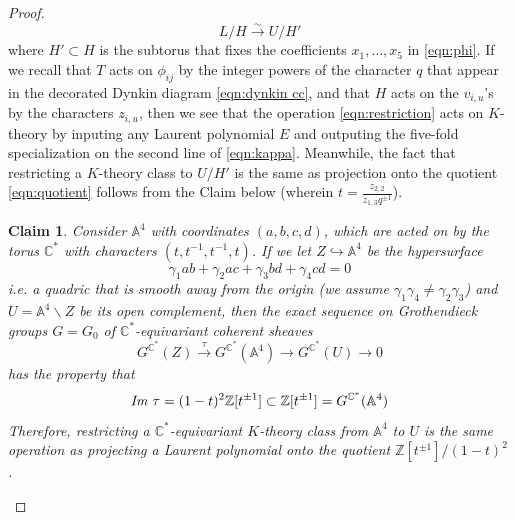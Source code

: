 \documentclass{amsart}
\newtheorem{claim}[subsection]{Claim}
\def\BA{{\mathbb{A}}}
\def\BC{{\mathbb{C}}}
\def\BZ{{\mathbb{Z}}}
\begin{document}
\begin{proof}
\begin{equation}
\label{eqn:restriction}
L/H \xrightarrow{\sim} U/H'
\end{equation}
where $H' \subset H$ is the subtorus that fixes the coefficients $x_1,\dots,x_5$ in \eqref{eqn:phi}. If we recall that $T$ acts on $\phi_{ij}$ by the integer powers of the character $q$ that appear in the decorated Dynkin diagram \eqref{eqn:dynkin cc}, and that $H$ acts on the $v_{i,u}$'s by the characters $z_{i,u}$, then we see that the operation \eqref{eqn:restriction} acts on $K$-theory by inputing any Laurent polynomial $E$ and outputing the five-fold specialization on the second line of \eqref{eqn:kappa}. Meanwhile, the fact that restricting a $K$-theory class to $U/H'$ is the same as projection onto the quotient \eqref{eqn:quotient} follows from the Claim below (wherein $t = \frac {z_{2,2}}{z_{1,3}q^{\pm 1}}$).

\medskip 

\begin{claim}

Consider $\BA^4$ with coordinates $(a,b,c,d)$, which are acted on by the torus $\BC^*$ with characters $(t,t^{-1},t^{-1},t)$. If we let $Z \hookrightarrow \BA^4$ be the hypersurface
\begin{equation}
\label{eqn:eqn}
\gamma_1 ab + \gamma_2 ac + \gamma_3 bd + \gamma_4 cd = 0
\end{equation}
i.e. a quadric that is smooth away from the origin (we assume $\gamma_1\gamma_4 \neq \gamma_2\gamma_3$) and $U = \BA^4 \backslash Z$ be its open complement, then the exact sequence on Grothendieck groups $G = G_0$ of $\BC^*$-equivariant coherent sheaves
\[
G^{\BC^*}(Z) \xrightarrow{\tau} G^{\BC^*}(\BA^4) \rightarrow G^{\BC^*}(U) \rightarrow 0
\]
has the property that 
\[
\emph{Im }\tau = (1-t)^2 \BZ[t^{\pm 1}] \subset \BZ[t^{\pm 1}] = G^{\BC^*}(\BA^4)
\]
Therefore, restricting a $\BC^*$-equivariant $K$-theory class from $\BA^4$ to $U$ is the same operation as projecting a Laurent polynomial onto the quotient $\BZ[t^{\pm 1}]/(1-t)^2$.

\end{claim}

\medskip 


\end{proof}
\end{document}
